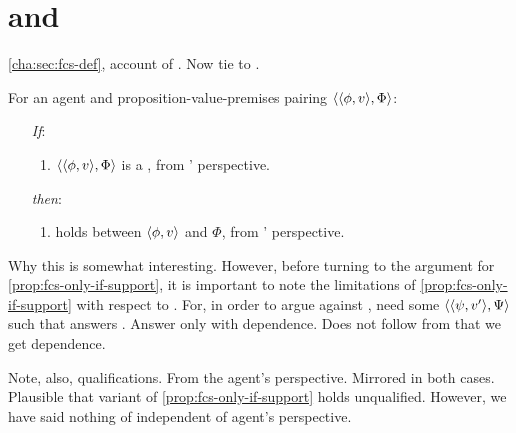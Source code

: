 \section{ and }
\label{cha:fcs:sec:fcs-support}

\begin{note}
  \autoref{cha:sec:fcs-def}, account of .
  Now tie to .
\end{note}

\begin{note}
  \begin{proposition}
    \label{prop:fcs-only-if-support}
    For an agent \vAgent{} and proposition-value-premises pairing \(\langle \langle \phi, v \rangle, \Phi \rangle\):
    \begin{enumerate}
    \item[\emph{If}:]
      \begin{enumerate}[label=\alph*., ref=(\alph*.)]
      \item
        \(\langle \langle \phi, v \rangle, \Phi \rangle\) is a , from \vAgent{}' perspective.
      \end{enumerate}
    \item[\emph{then}:]
      \begin{enumerate}[label=\alph*., ref=(\alph*.), resume]
      \item
         holds between \(\langle \phi, v \rangle\) and \(\Phi\), from \vAgent{}' perspective.
      \end{enumerate}
    \end{enumerate}
    \vspace{-\baselineskip}
  \end{proposition}

  {
    \color{red}
    Why this is somewhat interesting.
  }
  However, before turning to the argument for \autoref{prop:fcs-only-if-support}, it is important to note the limitations of \autoref{prop:fcs-only-if-support} with respect to \issueConstraint{}.
  For, in order to argue against \issueConstraint{}, need some \(\langle \langle \psi, v' \rangle, \Psi \rangle\) such that answers \qWhyV{}.
  Answer \qWhyV{} only with dependence.
  Does not follow from  that we get dependence.

  Note, also, qualifications.
  From the agent's perspective.
  Mirrored in both cases.
  Plausible that variant of \autoref{prop:fcs-only-if-support} holds unqualified.
  However, we have said nothing of \support{} independent of agent's perspective.
\end{note}

